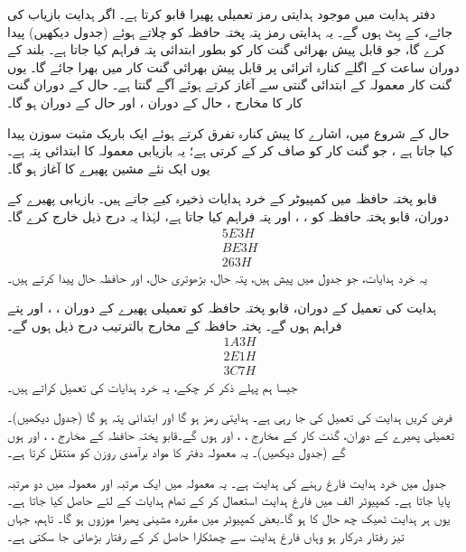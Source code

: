 دفتر ہدایت میں موجود  ہدایتی رمز   تعمیلی پھیرا قابو کرتا ہے۔ اگر  ہدایت  بازیاب کی جائے،  کے بِٹ  ہوں گے۔ یہ ہدایتی رمز پتہ پختہ حافظہ کو چلاتے ہوئے  (جدول  دیکھیں) پیدا کرے گا، جو قابل پیش بھرائی گنت کار کو بطور ابتدائی پتہ   فراہم کیا جاتا ہے۔ بلند  کے دوران ساعت کے اگلے کنارہ اترائی پر   قابل پیش بھرائی گنت کار میں  بھرا جائے گا۔ یوں گنت کار معمولہ  کے  ابتدائی گنتی سے آغاز کرتے ہوئے آگے گنتا ہے۔  حال کے دوران گنت کار کا مخارج ،   حال کے دوران ، اور  حال کے دوران  ہو گا۔

 حال کے   شروع  میں،  اشارے کا   پیش کنارہ تفرق   کرتے ہوئے  ایک  باریک مثبت   سوزن  پیدا کیا جاتا ہے ، جو گنت کار کو صاف کر کے   کرتی  ہے؛ یہ   بازیابی معمولہ  کا ابتدائی پتہ ہے۔ یوں ایک نئے مشین پھیرے کا آغاز ہو گا۔

قابو پختہ حافظہ میں کمپیوٹر کے خرد ہدایات ذخیرہ کیے جاتے ہیں۔ بازیابی پھیرے کے دوران،  قابو پختہ حافظہ  کو ، ، اور  پتہ فراہم کیا جاتا ہے، لہٰذا  یہ درج ذیل خارج کرے گا۔
\begin{align*}
&5E3H\\
&BE3H\\
&263H
\end{align*}
یہ خرد ہدایات، جو جدول  میں پیش ہیں، پتہ حال، بڑھوتری حال، اور حافظہ حال پیدا کرتے ہیں۔

  ہدایت  کی تعمیل کے دوران، قابو پختہ حافظہ کو تعمیلی پھیرے کے دوران ، ، اور  پتے فراہم  ہوں گے۔ پختہ حافظہ کے  مخارج  بالترتیب درج ذیل ہوں گے۔
\begin{align*}
&1A3H\\
&2E1H\\
&3C7H
\end{align*}
جیسا ہم پہلے ذکر کر چکے، یہ خرد ہدایات   کی تعمیل کراتے ہیں۔

فرض کریں  ہدایت کی تعمیل  کی جا رہی ہے۔ ہدایتی رمز  ہو گا اور  ابتدائی پتہ  ہو گا  (جدول  دیکھیں)۔ تعمیلی پھیرے کے دوران،  گنت کار کے مخارج ، ، اور  ہوں گے۔قابو پختہ حافظہ  کے مخارج ، ، اور  ہوں گے (جدول  دیکھیں)۔ یہ معمولہ دفتر  کا مواد برآمدی  روزن  کو منتقل کرتا ہے۔

جدول  میں  خرد ہدایت  فارغ رہنے کی ہدایت ہے۔ یہ   معمولہ میں ایک مرتبہ اور  معمولہ میں دو  مرتبہ  پایا جاتا ہے۔  کمپیوٹر  الف میں فارغ ہدایت  استعمال کر کے تمام ہدایات کے لئے  حاصل کیا جاتا ہے۔یوں ہر ہدایت ٹھیک چھ  حال کا ہو گا۔بعض کمپیوٹر میں   مقررہ مشینی پھیرا موزوں ہو گا۔ تاہم، جہاں تیز رفتار درکار ہو وہاں فارغ  ہدایت  سے چھٹکارا حاصل کر کے رفتار بڑھائی جا سکتی ہے۔

